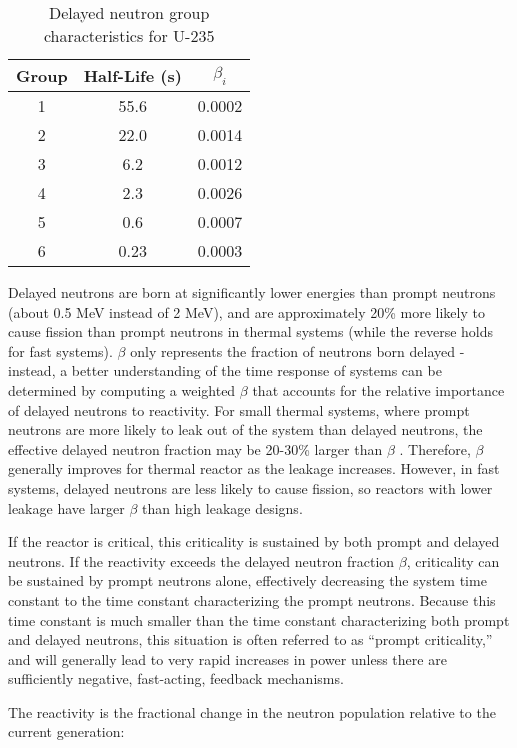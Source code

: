 \begin{table}[h]
\caption{Delayed neutron group characteristics for U-235 \cite{duderstadt}}
\centering
\begin{tabular}{c |c c}
\hline\hline
 Group & Half-Life (s) & \(\beta_i\) \\ [0.5ex]
\hline 
1 & 55.6 & 0.0002 \\
2 & 22.0 & 0.0014 \\
3 & 6.2  & 0.0012 \\
4 & 2.3  & 0.0026 \\
5 & 0.6  & 0.0007 \\
6 & 0.23 & 0.0003 \\
\hline
\end{tabular}
\label{tab:U235_kinetics}
\end{table}

Delayed neutrons are born at significantly lower energies than prompt neutrons (about 0.5 MeV instead of 2 MeV), and are approximately 20\% more likely to cause fission than prompt neutrons in thermal systems (while the reverse holds for fast systems). \(\beta\) only represents the fraction of neutrons born delayed - instead, a better understanding of the time response of systems can be determined by computing a weighted \(\beta\) that accounts for the relative importance of delayed neutrons to reactivity. For small thermal systems, where prompt neutrons are more likely to leak out of the system than delayed neutrons, the effective delayed neutron fraction may be 20-30\% larger than \(\beta\) \cite{duderstadt}. Therefore, \(\beta\) generally improves for thermal reactor as the leakage increases. However, in fast systems, delayed neutrons are less likely to cause fission, so reactors with lower leakage have larger \(\beta\) than high leakage designs. 

If the reactor is critical, this criticality is sustained by both prompt and delayed neutrons. If the reactivity exceeds the delayed neutron fraction \(\beta\), criticality can be sustained by prompt neutrons alone, effectively decreasing the system time constant to the time constant characterizing the prompt neutrons. Because this time constant is much smaller than the time constant characterizing both prompt and delayed neutrons, this situation is often referred to as ``prompt criticality,'' and will generally lead to very rapid increases in power unless there are sufficiently negative, fast-acting, feedback mechanisms. 

The reactivity is the fractional change in the neutron population relative to the current generation:

